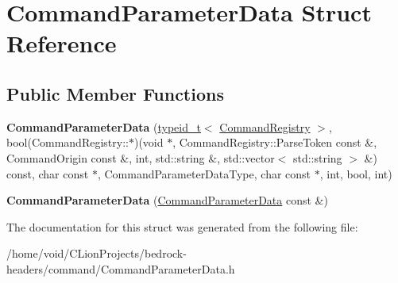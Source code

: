 \hypertarget{struct_command_parameter_data}{}\section{Command\+Parameter\+Data Struct Reference}
\label{struct_command_parameter_data}
\subsection*{Public Member Functions}
\begin{DoxyCompactItemize}
\item 
\mbox{\label{struct_command_parameter_data_a55a9411a6afbf82d6d1a4c7473732a48}} 
{\bfseries Command\+Parameter\+Data} (\mbox{\hyperlink{structtypeid__t}{typeid\+\_\+t}}$<$ \mbox{\hyperlink{struct_command_registry}{Command\+Registry}} $>$, bool(Command\+Registry\+::$\ast$)(void $\ast$, Command\+Registry\+::\+Parse\+Token const \&, Command\+Origin const \&, int, std\+::string \&, std\+::vector$<$ std\+::string $>$ \&) const, char const $\ast$, Command\+Parameter\+Data\+Type, char const $\ast$, int, bool, int)
\item 
\mbox{\label{struct_command_parameter_data_ab9bc7c2abbb074579b0b1f8395cbd5f8}} 
{\bfseries Command\+Parameter\+Data} (\mbox{\hyperlink{struct_command_parameter_data}{Command\+Parameter\+Data}} const \&)
\end{DoxyCompactItemize}


The documentation for this struct was generated from the following file\+:\begin{DoxyCompactItemize}
\item 
/home/void/\+C\+Lion\+Projects/bedrock-\/headers/command/Command\+Parameter\+Data.\+h\end{DoxyCompactItemize}
